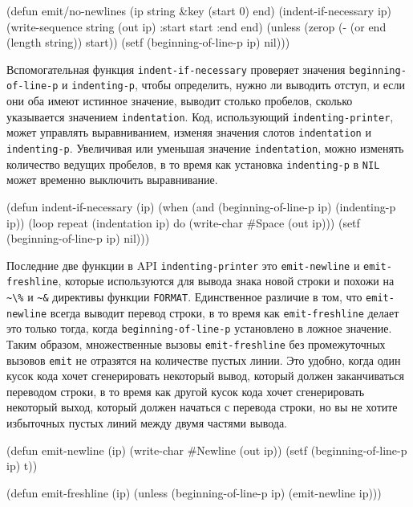 \begin{myverb}
(defun emit/no-newlines (ip string &key (start 0) end)
  (indent-if-necessary ip)
  (write-sequence string (out ip) :start start :end end)
  (unless (zerop (- (or end (length string)) start))
    (setf (beginning-of-line-p ip) nil)))
\end{myverb}

Вспомогательная функция \lstinline{indent-if-necessary} проверяет значения
\lstinline{beginning-of-line-p} и \lstinline{indenting-p}, чтобы определить, нужно ли выводить
отступ, и если они оба имеют истинное значение, выводит столько пробелов, сколько
указывается значением \lstinline{indentation}. Код, использующий \lstinline{indenting-printer},
может управлять выравниванием, изменяя значения слотов \lstinline{indentation} и
\lstinline{indenting-p}. Увеличивая или уменьшая значение \lstinline{indentation}, можно изменять
количество ведущих пробелов, в то время как установка \lstinline{indenting-p} в \lstinline{NIL}
может временно выключить выравнивание.

\begin{myverb}
(defun indent-if-necessary (ip)
  (when (and (beginning-of-line-p ip) (indenting-p ip))
    (loop repeat (indentation ip) do (write-char #\bslash{}Space (out ip)))
    (setf (beginning-of-line-p ip) nil)))
\end{myverb}

Последние две функции в API \lstinline{indenting-printer} это \lstinline{emit-newline} и
\lstinline{emit-freshline}, которые используются для вывода знака новой строки и похожи на
\lstinline!~\%! и \lstinline!~&! директивы функции \lstinline{FORMAT}. Единственное различие в
том, что \lstinline{emit-newline} всегда выводит перевод строки, в то время как
\lstinline{emit-freshline} делает это только тогда, когда \lstinline{beginning-of-line-p}
установлено в ложное значение. Таким образом, множественные вызовы \lstinline{emit-freshline}
без промежуточных вызовов \lstinline{emit} не отразятся на количестве пустых линии. Это удобно,
когда один кусок кода хочет сгенерировать некоторый вывод, который должен заканчиваться
переводом строки, в то время как другой кусок кода хочет сгенерировать некоторый выход,
который должен начаться с перевода строки, но вы не хотите избыточных пустых линий между
двумя частями вывода.

\begin{myverb}
(defun emit-newline (ip)
  (write-char #\bslash{}Newline (out ip))
  (setf (beginning-of-line-p ip) t))

(defun emit-freshline (ip)
  (unless (beginning-of-line-p ip) (emit-newline ip)))
\end{myverb}

